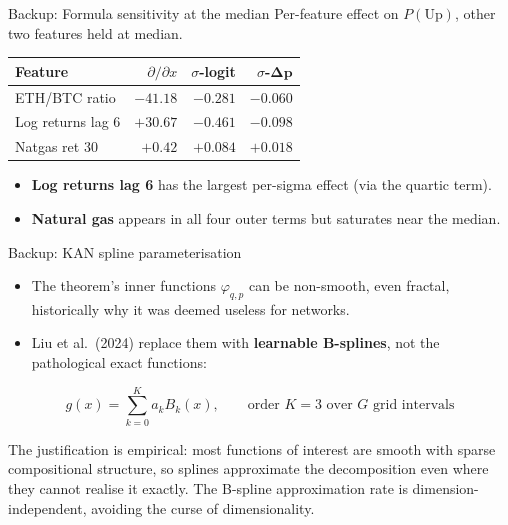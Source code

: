 \documentclass[aspectratio=169, t]{beamer}
\begin{document}
\begin{frame}{Backup: Formula sensitivity at the median}
\vspace{-0.5em}
\centering
{\footnotesize Per-feature effect on $P(\mathrm{Up})$, other two features held at median.}
\vspace{0.5em}
\begin{center}
\renewcommand{\arraystretch}{1.3}
\scriptsize
\begin{tabular}{l r r r}
\toprule
\textbf{Feature} & $\partial/\partial x$ & $\sigma$\textbf{-logit} & $\sigma$-$\mathbf{\Delta p}$ \\
\midrule
ETH/BTC ratio     & $-41.18$ & $-0.281$ & $-0.060$ \\
Log returns lag 6 & $+30.67$ & $-0.461$ & $-0.098$ \\
Natgas ret 30     & $+0.42$  & $+0.084$ & $+0.018$ \\
\bottomrule
\end{tabular}
\end{center}
\vspace{0.4em}
\begin{itemize}\scriptsize
  \item \textbf{Log returns lag 6} has the largest per-sigma effect (via the quartic term).
  \item \textbf{Natural gas} appears in all four outer terms but saturates near the median.
\end{itemize}
\end{frame}


\begin{frame}{Backup: KAN spline parameterisation}
\vspace{-0.4em}

\begin{itemize}\footnotesize
  \item The theorem's inner functions $\varphi_{q,p}$ can be non-smooth, even fractal, historically why it was deemed useless for networks.
  \item Liu et al.\ (2024) replace them with \textbf{learnable B-splines}, not the pathological exact functions:
\end{itemize}

\vspace{0.2em}
\[
  g(x) = \sum_{k=0}^{K} a_k B_k(x), \qquad \text{order } K=3 \text{ over } G \text{ grid intervals}
\]
\vspace{-0.2em}

{\footnotesize The justification is empirical: most functions of interest are smooth with sparse compositional structure, so splines approximate the decomposition even where they cannot realise it exactly. The B-spline approximation rate is dimension-independent, avoiding the curse of dimensionality.}
\end{frame}
\end{document}

